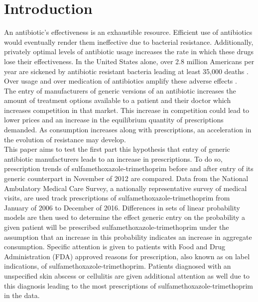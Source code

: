 \chapter{Introduction}
An antibiotic's effectiveness is an exhaustible resource. Efficient use of antibiotics would eventually render them ineffective due to bacterial resistance. Additionally, privately optimal levels of antibiotic usage increases the rate in which these drugs lose their effectiveness. In the United States alone, over 2.8 million Americans per year are sickened by antibiotic resistant bacteria leading at least 35,000 deaths \cite{centers_for_disease_control_and_prevention_us_antibiotic_2019}. Over usage and over medication of antibiotics amplify these adverse effects \cite{gerber_outpatient_2019}.\\
\indent The entry of manufacturers of generic versions of an antibiotic increases the amount of treatment options available to a patient and their doctor which increases competition in that market. This increase in competition could lead to lower prices and an increase in the equilibrium quantity of prescriptions demanded. As consumption increases along with prescriptions, an acceleration in the evolution of resistance may develop.\\
\indent This paper aims to test the first part this hypothesis that entry of generic antibiotic manufacturers leads to an increase in prescriptions. To do so, prescription trends of sulfamethoxazole-trimethoprim before and after entry of its generic counterpart in November of 2012 are compared. Data from the National Ambulatory Medical Care Survey, a nationally representative survey of medical visits, are used track prescriptions of sulfamethoxazole-trimethoprim from January of 2006 to December of 2016. Differences in sets of linear probability models are then used to determine the effect generic entry on the probability a given patient will be prescribed sulfamethoxazole-trimethoprim under the assumption that an increase in this probability indicates an increase in aggregate consumption. Specific attention is given to patients with Food and Drug Administration (FDA) approved reasons for prescription, also known as on label indications, of sulfamethoxazole-trimethoprim. Patients diagnosed with an unspecified skin abscess or cellulitis are given additional attention as well due to this diagnosis leading to the most prescriptions of sulfamethoxazole-trimethoprim in the data.\\
